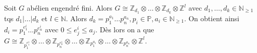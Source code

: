   \begin{remark}
    Soit $G$ abélien engendré fini. Alors $G \cong \mathbb{Z}_{d_1} \otimes \dots \otimes \mathbb{Z}_{d_k} \otimes \mathbb{Z}^l$ avec $d_1, \dots, d_k \in \mathbb{N}_{ \ge 1}$ tqs $d_1|\dots|d_k$ et $l\in \mathbb{N}$. Alors $d_k=p_1^{a_1}\dots p_n^{a_n}, p_i \in \mathbb{P} ,a_i \in \mathbb{N}_{\ge 1}$. On obtient ainsi $d_i=p_1^{e^i_1}\dots p_{n}^{e^i_n}$ avec $0\le e^i_j \le a_j$. Dès lors on a que $G \cong \mathbb{Z}_{p_1^{e_1^1}} \otimes \dots \otimes \mathbb{Z}_{p_n^{e_n^1}} \otimes \dots \otimes \mathbb{Z}_{p_1^{a_1}} \otimes \dots \otimes \mathbb{Z}_{p_n^{a_n}} \otimes  \mathbb{Z}^l$.
        \end{remark}

        
        
        
        
        